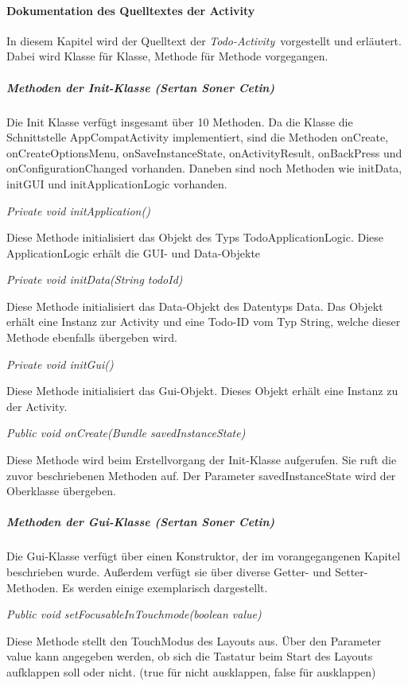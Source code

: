 \paragraph{Dokumentation des Quelltextes der Activity}
In diesem Kapitel wird der Quelltext der \textit{Todo-Activity}\ vorgestellt und erläutert. Dabei wird Klasse für Klasse, Methode für Methode vorgegangen.

\subparagraph{Methoden der Init-Klasse (Sertan Soner Cetin)}

Die Init Klasse verfügt insgesamt über 10 Methoden. Da die Klasse die Schnittstelle AppCompatActivity implementiert, sind die Methoden onCreate, onCreateOptionsMenu, onSaveInstanceState, onActivityResult, onBackPress und onConfigurationChanged vorhanden. Daneben sind noch Methoden wie initData, initGUI und initApplicationLogic vorhanden.

\textit{Private void initApplication()}

Diese Methode initialisiert das Objekt des Typs TodoApplicationLogic. Diese ApplicationLogic erhält die GUI- und Data-Objekte

\textit{Private void initData(String todoId)}

Diese Methode initialisiert das Data-Objekt des Datentyps Data. Das Objekt erhält eine Instanz zur Activity und eine Todo-ID vom Typ String, welche dieser Methode ebenfalls übergeben wird.

\textit{Private void initGui()}

Diese Methode initialisiert das Gui-Objekt. Dieses Objekt erhält eine Instanz zu der Activity.

\textit{Public void onCreate(Bundle savedInstanceState)}

Diese Methode wird beim Erstellvorgang der Init-Klasse aufgerufen. Sie ruft die zuvor beschriebenen Methoden auf. Der Parameter savedInstanceState wird der Oberklasse übergeben.

\subparagraph{Methoden der Gui-Klasse (Sertan Soner Cetin)}

Die Gui-Klasse verfügt über einen Konstruktor, der im vorangegangenen Kapitel beschrieben wurde. Außerdem verfügt sie über diverse Getter- und Setter-Methoden. Es werden einige exemplarisch dargestellt.

\textit{Public void setFocusableInTouchmode(boolean value)}

Diese Methode stellt den TouchModus des Layouts aus. Über den Parameter value kann angegeben werden, ob sich die Tastatur beim Start des Layouts aufklappen soll oder nicht. (true für nicht ausklappen, false für ausklappen)

